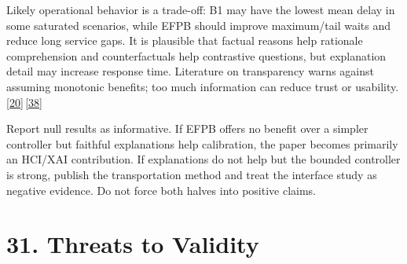 \documentclass[
  english,
  11pt,
  a4paper,
]{article}
\begin{document}
Likely operational behavior is a trade-off: B1 may have the lowest mean
delay in some saturated scenarios, while EFPB should improve
maximum/tail waits and reduce long service gaps. It is plausible that
factual reasons help rationale comprehension and counterfactuals help
contrastive questions, but explanation detail may increase response
time. Literature on transparency warns against assuming monotonic
benefits; too much information can reduce trust or
usability.\hyperref[source-20]{[20]}\,\hyperref[source-38]{[38]}

Report null results as informative. If EFPB offers no benefit over a
simpler controller but faithful explanations help calibration, the paper
becomes primarily an HCI/XAI contribution. If explanations do not help
but the bounded controller is strong, publish the transportation method
and treat the interface study as negative evidence. Do not force both
halves into positive claims.

\section{31. Threats to Validity}\label{threats-to-validity}
\end{document}
